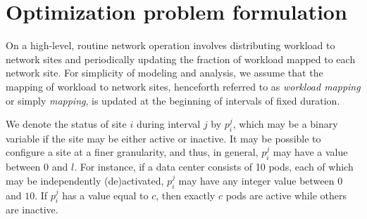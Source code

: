 
\section{Optimization problem formulation}
\label{sec:framework:optimization}
On a high-level, routine network operation involves distributing workload to network sites and periodically updating the fraction of workload mapped to each network site. For simplicity of modeling and analysis, we assume that the mapping of workload to network sites, henceforth referred to as \textit{workload mapping} or simply \textit{mapping}, is updated at the beginning of intervals of fixed duration. 

We denote the status of site $i$ during interval $j$ by $p_i^j$, which may be a binary variable if the site may be either active or inactive. It may be possible to configure a site at a finer granularity, and thus, in general, $p_i^j$ may have a value between $0$ and $l$. For instance, if a data center consists of 10 pods, each of which may be independently (de)activated, $p_i^j$ may have any integer value between $0$ and $10$. If $p_i^j$ has a value equal to $c$, then exactly $c$ pods are active while others are inactive. 

